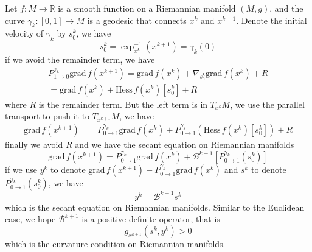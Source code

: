 \documentclass[12pt,a4paper,draft]{article}  %
\theoremstyle{definition}
\numberwithin{equation}{section}
\newcommand{\RR}{\mathbb{R}}
\newcommand{\grad}{\mathrm{grad}\,}
\newcommand{\hess}{\mathrm{Hess}\,}
\begin{document}
Let $f: M \to \RR$ is a smooth function on a Riemannian manifold $(M,g)$, and the curve $\gamma_k: [0,1] \to M$ is a geodesic that connects $x^k$ and $x^{k+1}$. Denote the initial velocity of $\gamma_k$ by $s^k_0$, we have
\[
s^k_0 = \exp_{x^k}^{-1}(x^{k+1}) = \dot{\gamma}_k(0)
\]
if we avoid the remainder term, we have
\[
\begin{aligned}
P_{1\to0}^{\gamma_k} \grad f(x^{k+1}) = \grad f(x^k) + \nabla_{s^k_0} \grad f(x^k) + R\\
= \grad f(x^k) + \hess f(x^k)[s^k_0] + R
\end{aligned}
\]
where $R$ is the remainder term. But the left term is in $T_{x^k} M$, we use the parallel transport to push it to $T_{x^{k+1}} M$, we have
\[
        \begin{aligned}
        \grad f(x^{k+1}) &= P_{0\to1}^{\gamma_k} \grad f(x^k) + P_{0\to1}^{\gamma_k} \left(\hess f(x^k)[s^k_0]\right) + R
        \end{aligned}
\]
finally we avoid $R$ and we have the secant equation on Riemannian manifolds
\begin{equation}
        \grad f(x^{k+1}) = P_{0\to1}^{\gamma_k} \grad f(x^k) + \mathcal{B}^{k+1}[P_{0\to1}^{\gamma_k} (s^k_0)]
\end{equation}
if we use $y^k$ to denote $\grad f(x^{k+1}) - P_{0\to1}^{\gamma_k} \grad f(x^k)$ and $s^k$ to denote $P_{0\to1}^{\gamma_k} (s^k_0)$, we have
\begin{equation}\label{secant_equation_riemannian}
        y^k = \mathcal{B}^{k+1} s^k
\end{equation}
which is the secant equation on Riemannian manifolds. Similar to the Euclidean case, we hope $\mathcal{B}^{k+1}$ is a positive definite operator, that is
\begin{equation}\label{curvature_condition_riemannian}
        g_{x^{k+1}}(s^k, y^k) > 0
\end{equation}
which is the curvature condition on Riemannian manifolds. 
\end{document}

